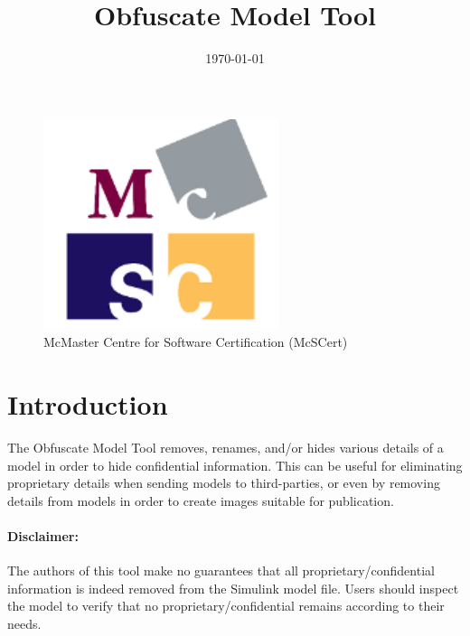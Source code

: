 \documentclass{article}
\makeatletter
\newcommand{\ToolName}{Obfuscate Model Tool\@\xspace}
\makeatother
\begin{document}
\title{\ToolName}
\date{\monthyeardate\today}
\maketitle
\vfill

\begin{figure}
	\centering
	\includegraphics[]{../figs/McSCert_Logo.pdf} \\
	McMaster Centre for Software Certification (McSCert)
\end{figure}

\newpage


\tableofcontents
\newpage

\section{Introduction}

The \ToolName removes, renames, and/or hides various details of a \Simulink model in order to hide confidential information.
This can be useful for eliminating proprietary details when sending models to third-parties, or even by removing details from models in order to create images suitable for publication.

\paragraph{Disclaimer:} The authors of this tool make no guarantees that all proprietary/confidential information is indeed removed from the Simulink model file. Users should inspect the model to verify that no proprietary/confidential remains according to their needs.
\end{document}
